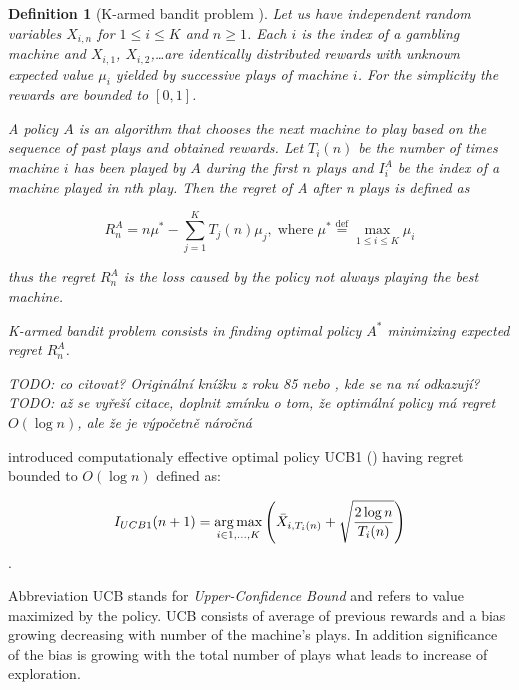 \begin{samepage}
\newtheorem*{defmab}{Definition}
\begin{defmab}[K-armed bandit problem ] 

Let us have independent random variables $X_{i,n}$ for $1 \le i \le K$ and $n \ge 1$. Each $i$ is
the index of a gambling machine and $X_{i,1}$, $X_{i,2}$,\ldots are identically distributed rewards
with unknown expected value $\mu_i$ yielded by successive plays of machine $i$. For the simplicity
the rewards are bounded to $[0,1]$.

A policy $A$ is an algorithm that chooses the next machine to play based on the sequence of
past plays and obtained rewards. Let $T_i(n)$ be the number of times machine $i$ has been played by
$A$ during the first $n$ plays and $I_i^A$ be the index of a machine played in nth play. Then the
regret of A after n plays is defined as

\begin{equation}
R_n^A = n \mu^* - \sum_{j=1}^K T_j(n) \mu_j \mathrm{,\;where}\;\mu^* \stackrel{\mathrm{def}}{=}
\max_{1 \le i \le K} \mu_i
\end{equation}

thus the regret $R_n^A$ is the loss caused by the policy not always playing the best machine.

K-armed bandit problem consists in finding optimal policy $A^*$ minimizing
expected regret $R_n^A$.

\end{defmab}
\end{samepage}

\emph{TODO: co citovat? Originální knížku z roku 85 nebo \cite{Auer2002}, kde se na ní odkazují?}
\emph{TODO: až se vyřeší citace, doplnit zmínku o tom, že optimální policy má regret  ~$O(\log{n})$,
ale že je výpočetně náročná}

 introduced computationaly effective optimal policy UCB1 (\cite{Auer2002}) having
regret bounded to $O(\log{n})$ defined as:

\begin{equation}
 I_{UCB1}(n+1) = \operatorname*{arg\,max}\limits_{i\in{1,\ldots,K}} \left({\bar{X}_{i,T_i(n)} 
+ \sqrt{{2 \log{n}} \over T_i(n)}}\right)
 \end{equation}.

Abbreviation UCB stands for \emph{Upper-Confidence Bound} and refers to value maximized by the
policy. UCB consists of average of previous rewards and a bias growing decreasing with number of the
machine's plays. In addition significance of the bias is growing with the total number of plays what
leads to increase of exploration.

